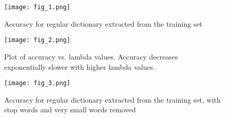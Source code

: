 \documentclass{article}
\begin{document}
	\begin{figure}[h]
		\centering
		\texttt{[image: fig\_1.png]}
		\caption{Accuracy for regular dictionary extracted from the training
		set}
	\end{figure}
	\begin{figure}[h]
		\centering
		\texttt{[image: fig\_2.png]}
		\caption{Plot of accuracy vs. lambda values. Accuracy decreases 
		exponentially slower with higher lambda values.}
	\end{figure}
	\begin{figure}[h]
		\centering
		\texttt{[image: fig\_3.png]}
		\caption{Accuracy for regular dictionary extracted from the training
		set, with stop words and very small words removed}
	\end{figure}
\end{document}
